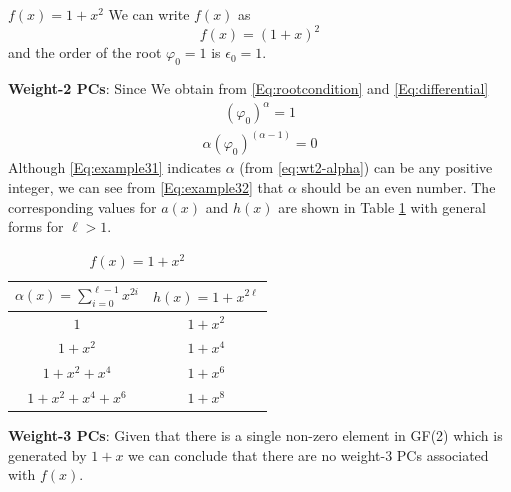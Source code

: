 \begin{example}
	$f(x)=1+x^2$\newline
	We can write $f(x)$ as
	\[
	f(x)=(1+x)^2\]
	and the order of the root $\varphi_0=1$ is $\epsilon_0=1$.
	
	\textbf{Weight-2 PCs}: Since 
	We obtain from \eqref{Eq:rootcondition} and \eqref{Eq:differential}
	\begin{align}
		(\varphi_0)^{\alpha} = 1
		\label{Eq:example31}
	\end{align}
	\begin{align}
		\alpha(\varphi_0)^{(\alpha-1)} = 0
		\label{Eq:example32}
	\end{align}	
	Although \eqref{Eq:example31} indicates $\alpha$ (from \eqref{eq:wt2-alpha}) can be any positive integer, we can see from \eqref{Eq:example32} that $\alpha$  should be an even number.
	The corresponding values for $a(x)$ and $h(x)$ are shown in Table \ref{novelTab1} with general forms for $\ell>1$.
	\begin{table}[htbp]
		\renewcommand{\arraystretch}{1.3}
		\caption{$f(x)=1+x^2$}
		\centering
		\begin{tabular}{c c } 
			\hline
			$\alpha(x)=\sum_{i=0}^{\ell-1} x^{2i}$ & $h(x)=1+x^{2\ell}$ \\ [0.5ex] 
			\hline\hline
			$1$ & $1+x^2$\\ 
			$1+x^2$ & $1+x^4$ \\
			$1+x^2+x^4$ & $1+x^6$\\
			$1+x^2+x^4+x^6$ & $1+x^8$ 
		\end{tabular}
		\label{novelTab1}
	\end{table}
	
	\textbf{Weight-3 PCs}:
	Given that there is a single non-zero element in GF(2) which is generated by $1+x$ we can conclude that there are no weight-3 PCs associated with $f(x)$.
\label{ex-3}
\end{example}



